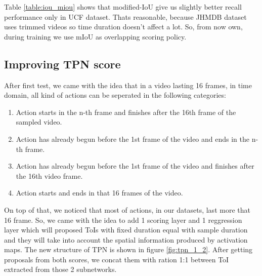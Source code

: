 \documentclass{report}
\begin{document}
Table \ref{table:iou_miou} shows that modified-IoU give us slightly better recall performance only in UCF dataset. Thats reasonable, because JHMDB dataset
uses trimmed videos so time duration doesn't affect a lot. So, from now own, during training we use mIoU as overlapping scoring policy.

\subsection{Improving TPN score}
After first test, we came with the idea that in a video lasting 16 frames, in time domain, all kind of actions can be seperated in the following categories:
\begin{enumerate}
\item Action starts in the n-th  frame and finishes after the 16th frame of the sampled video.
\item Action has already begun before the 1st frame of the video and ends in the n-th frame.
\item Action has already begun before the 1st frame of the video and finishes after the 16th video frame.
\item Action starts and ends in that 16 frames of the video.
\end{enumerate}

On top of that, we noticed that most of actions, in our datasets, last more that 16 frame. So, we came with the idea to add  1 scoring layer and 1 reggression layer
which will proposed ToIs with fixed duration equal with sample duration and they will take into account the spatial information produced by activation maps.
The new structure of TPN is shown in figure \ref{fig:tpn_1_2}. After getting proposals from both scores, we concat them with ration 1:1 between ToI extracted
from those 2 subnetworks.
\end{document}
